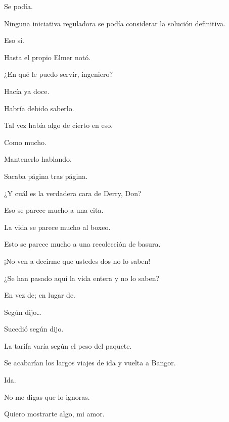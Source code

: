 \sk
Se podía. 

\sk
Ninguna iniciativa reguladora se podía considerar la solución definitiva. 

\sk
Eso sí. 

\sk
Hasta el propio Elmer notó. 

\sk
¿En qué le puedo servir, ingeniero? 

\sk
Hacía ya doce. 

\sk
Habría debido saberlo. 

\sk
Tal vez había algo de cierto en eso.  

\sk
Como mucho. 

\sk
Mantenerlo hablando. 

\sk
Sacaba página tras página. 

\sk
¿Y cuál es la verdadera cara de Derry, Don? \nb{}

\sk
Eso se parece mucho a una cita. 

\sk
La vida se parece mucho al boxeo. 

\sk
Esto se parece mucho a una recolección de basura. 

\sk
¡No ven a decirme que ustedes dos no lo saben! \nb{}

\sk
¿Se han pasado aquí la vida entera y no lo saben? \nb{}

\sk
En vez de; en lugar de. 

\sk
Según dijo\ldots{} 

\sk
Sucedió según dijo. 

\sk
La tarifa varía según el peso del paquete. 

\sk
Se acabarían los largos viajes de ida y vuelta a Bangor. 

\sk
Ida. 

\sk
No me digas que lo ignoras. 

\sk
Quiero mostrarte algo, mi amor. \nb{}

